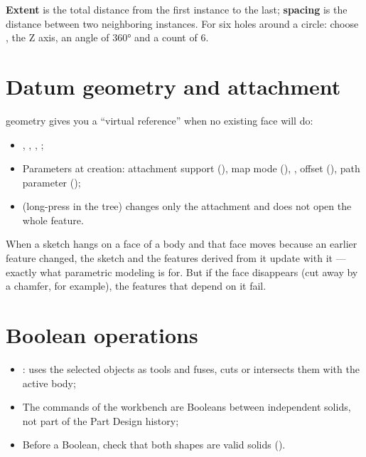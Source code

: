 \begin{tip}
\textbf{Extent} is the total distance from the first instance to the last; \textbf{spacing} is the distance between two
neighboring instances. For six holes around a circle: choose , the Z axis, an angle of 360° and a
count of 6.
\end{tip}

\section{Datum geometry and attachment}

 geometry gives you a ``virtual reference'' when no existing face will do:

\begin{itemize}
  \item {}, , , ;
  \item Parameters at creation: attachment support (), map mode (), , offset
        (), path parameter ();
  \item {} (long-press in the tree) changes only the attachment and does not open the whole feature.
\end{itemize}

\begin{warn}
When a sketch hangs on a face of a body and that face moves because an earlier feature changed, the sketch and the
features derived from it update with it --- exactly what parametric modeling is for. But if the face disappears (cut away
by a chamfer, for example), the features that depend on it fail.
\end{warn}

\section{Boolean operations}

\begin{itemize}
  \item {}: uses the selected objects as tools and fuses, cuts or intersects them with the active body;
  \item The  commands of the  workbench are Booleans between independent solids, not part of
        the Part Design history;
  \item Before a Boolean, check that both shapes are valid solids ().
\end{itemize}

